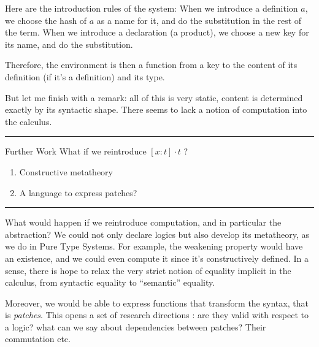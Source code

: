 \documentclass[ignorenonframetext,red]{beamer}
\begin{document}
Here are the introduction rules of the system: When we introduce a
definition $a$, we choose the hash of $a$ as a name for it, and do the
substitution in the rest of the term. When we introduce a declaration
(a product), we choose a new key for its name, and do the
substitution.

Therefore, the environment is then a function from a key to the
content of its definition (if it's a definition) and its type.

But let me finish with a remark: all of this is very static, content
is determined exactly by its syntactic shape. There seems to lack a
notion of computation into the calculus.

\hrule
\begin{frame}{Further Work}
  \Large
What if we reintroduce {\Huge $[x:t]\cdot t$} ?
\begin{enumerate} \normalsize
\pause
\item Constructive metatheory
\pause
\item A language to express patches?
\end{enumerate}
\end{frame}
\hrule

What would happen if we reintroduce computation, and in particular the
abstraction? We could not only declare logics but also develop its
metatheory, as we do in Pure Type Systems. For example, the weakening
property would have an existence, and we could even compute it since
it's constructively defined. In a sense, there is hope to relax the
very strict notion of equality implicit in the calculus, from
syntactic equality to ``semantic'' equality.

Moreover, we would be able to express functions that transform the
syntax, that is \emph{patches}. This opens a set of research
directions : are they valid with respect to a logic? what can we say
about dependencies between patches? Their commutation etc.
\end{document}
